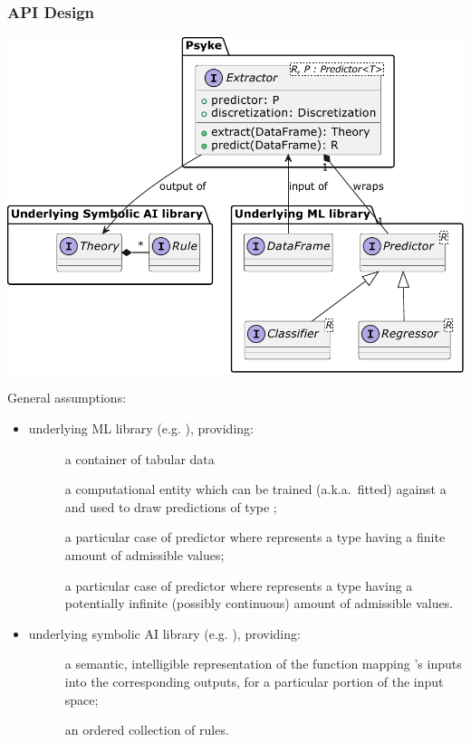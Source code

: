 \documentclass[presentation]{beamer}\mode<presentation>{\usetheme{AMSBolognaFC}}
\begin{document}
\begin{frame}[allowframebreaks]
\frametitle{API Design}

    \begin{center}
        \includegraphics[width=.7\linewidth]{figures/extractor-api.pdf}
    \end{center}

    \framebreak

    General assumptions:
    \begin{itemize}
        \item underlying ML library (e.g. \scikit{}), providing:
        \begin{description}
            \item[] a container of tabular data
            \item[] a computational entity which can be trained (a.k.a.\ fitted) against a  and used to draw predictions of type ;
            \item[] a particular case of predictor where  represents a type having a finite amount of admissible values;
            \item[] a particular case of predictor where  represents a type having a potentially infinite (possibly continuous) amount of admissible values.
        \end{description}

        \framebreak

        \item underlying symbolic AI library (e.g. \twopkt{}), providing:
        \begin{description}
            \item[] a semantic, intelligible representation of the function mapping 's inputs into the corresponding outputs, for a particular portion of the input space;
            \item[] an ordered collection of rules.
        \end{description}
    \end{itemize}
\end{frame}
\end{document}
